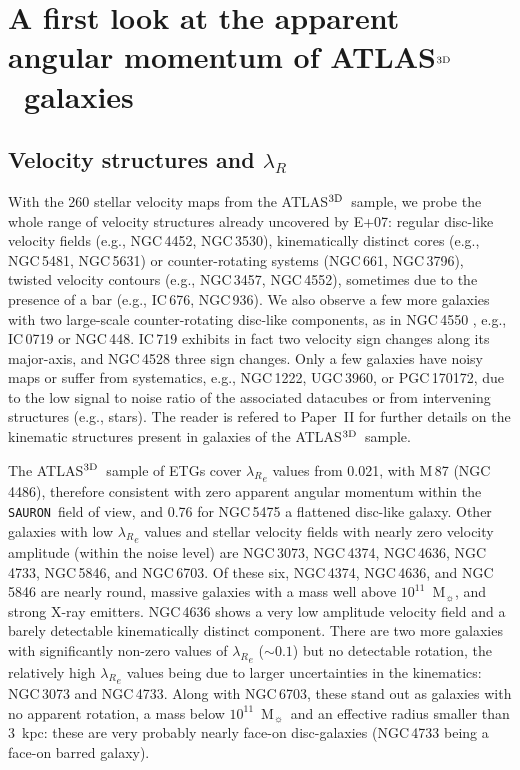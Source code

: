 \documentclass[useAMS,usenatbib,usegraphicx]{mn2e}
\newcommand{\Sauron}{\texttt{SAURON}}
\newcommand{\atlas}{{ATLAS$^{\rm 3D}$}}
\newcommand{\Msun} {$\mbox{M}_{\sun}$}
\begin{document}


\section{A first look at the apparent angular momentum of \atlas\ galaxies}
\label{sec:LambdaR}

\subsection{Velocity structures and $\lambda_R$}
\label{sec:vel}

With the 260 stellar velocity maps from the \atlas\ sample, we probe the whole
range of velocity structures already uncovered by E+07: regular disc-like velocity fields
(e.g., NGC\,4452, NGC\,3530), kinematically distinct cores (e.g., NGC\,5481,
NGC\,5631) or counter-rotating systems (NGC\,661, NGC\,3796), twisted
velocity contours (e.g., NGC\,3457, NGC\,4552), 
sometimes due to the presence of a bar (e.g., IC\,676, NGC\,936).
We also observe a few more galaxies with two large-scale counter-rotating disc-like
components, as in NGC\,4550 \citep{Rubin+92}, e.g., IC\,0719 or NGC\,448. IC\,719 exhibits in fact two
velocity sign changes along its major-axis, and NGC\,4528 three sign changes.
Only a few galaxies have noisy maps or suffer from systematics, e.g., NGC\,1222, UGC\,3960, 
or PGC\,170172, due to the low signal to noise ratio of the associated
datacubes or from intervening structures (e.g., stars). 
The reader is refered to Paper~II for further details on the
kinematic structures present in galaxies of the \atlas\ sample.

The \atlas\ sample of ETGs cover ${\lambda_R}_e$ values from 0.021, 
with M\,87 (NGC\,4486), therefore consistent with zero apparent angular
momentum within the \Sauron\ field of view, and 0.76 for NGC\,5475 a flattened
disc-like galaxy. Other galaxies with low ${\lambda_R}_e$
values and stellar velocity fields with nearly zero velocity amplitude (within
the noise level) are NGC\,3073, NGC\,4374, NGC\,4636, NGC\,4733, NGC\,5846, and NGC\,6703. 
Of these six, NGC\,4374, NGC\,4636, and NGC\,5846 are nearly round, 
massive galaxies with a mass well above $10^{11}$~\Msun, and strong X-ray emitters. 
NGC\,4636 shows a very low amplitude velocity field and a
barely detectable kinematically distinct component. There are two more
galaxies with significantly non-zero values of ${\lambda_R}_e$ ($\sim 0.1$) 
but no detectable rotation, the
relatively high ${\lambda_R}_e$ values being due to larger uncertainties in the
kinematics: NGC\,3073 and NGC\,4733. Along with NGC\,6703, these stand out as galaxies
with no apparent rotation, a mass below $10^{11}$~\Msun\, and an effective
radius smaller than 3~kpc: these are very probably nearly face-on disc-galaxies
(NGC\,4733 being a face-on barred galaxy).
\end{document}
